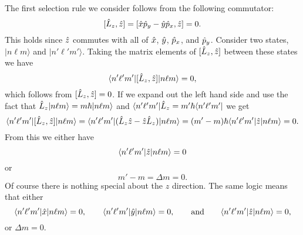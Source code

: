 \documentclass[a4paper]{article}
\renewcommand{\ket}[1]{\vert {#1} \rangle}
\renewcommand{\bra}[1]{\langle {#1} \vert}
\begin{document}
    The first selection rule we consider follows from the following commutator:
    \[[\hat{L}_z, \hat{z}] = [\hat{x}\hat{p}_y - \hat{y}\hat{p}_x, \hat{z}] = 0.\]
    This holds since \(\hat{z}\) commutes with all of \(\hat{x}\), \(\hat{y}\), \(\hat{p}_x\), and \(\hat{p}_y\).
    Consider two states, \(\ket{n\ell m}\) and \(\ket{n'\ell'm'}\).
    Taking the matrix elements of \([\hat{L}_z, \hat{z}]\) between these states we have
    \[\bra{n'\ell'm'}[\operator{L}_z, \operator{z}]\ket{n\ell m} = 0,\]
    which follows from \([\hat{L}_z, \hat{z}] = 0\).
    If we expand out the left hand side and use the fact that \(\operator{L}_z\ket{n\ell m} = m\hbar\ket{n\ell m}\) and \(\bra{n'\ell'm'}\operator{L}_z = m'\hbar\bra{n'\ell'm'}\) we get
    \[\bra{n'\ell'm'}[\operator{L}_z, \operator{z}]\ket{n\ell m} = \bra{n'\ell'm'}(\operator{L}_z\operator{z} - \operator{z}\operator{L}_z)\ket{n\ell m} = (m' - m)\hbar\bra{n'\ell'm'}\operator{z}\ket{n\ell m} = 0.\]
    From this we either have
    \[\bra{n'\ell'm'}\operator{z}\ket{n\ell m} = 0\]
    or
    \[m' - m = \Delta m = 0.\]
    Of course there is nothing special about the \(z\) direction.
    The same logic means that either
    \[\bra{n'\ell'm'}\operator{x}\ket{n\ell m} = 0, \qquad \bra{n'\ell'm'}\operator{y}\ket{n\ell m} = 0, \qquad\text{and}\qquad \bra{n'\ell'm'}\operator{z}\ket{n\ell m} = 0,\]
    or \(\Delta m = 0\).
    
\end{document}
